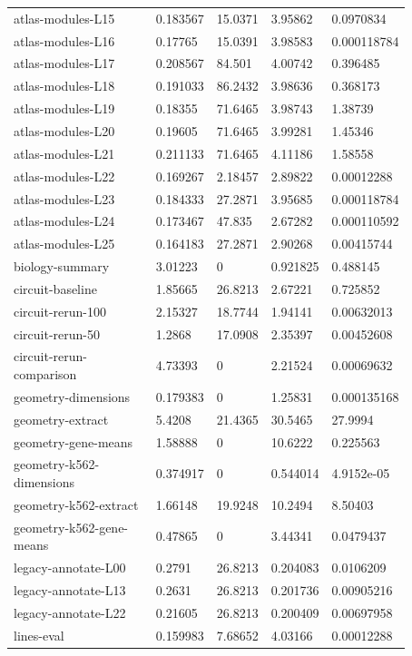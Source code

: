 \begin{longtable}{@{}L{0.39\linewidth}L{0.11\linewidth}L{0.12\linewidth}L{0.12\linewidth}L{0.13\linewidth}@{}}
atlas-modules-L15 & 0.183567 & 15.0371 & 3.95862 & 0.0970834 \\
atlas-modules-L16 & 0.17765 & 15.0391 & 3.98583 & 0.000118784 \\
atlas-modules-L17 & 0.208567 & 84.501 & 4.00742 & 0.396485 \\
atlas-modules-L18 & 0.191033 & 86.2432 & 3.98636 & 0.368173 \\
atlas-modules-L19 & 0.18355 & 71.6465 & 3.98743 & 1.38739 \\
atlas-modules-L20 & 0.19605 & 71.6465 & 3.99281 & 1.45346 \\
atlas-modules-L21 & 0.211133 & 71.6465 & 4.11186 & 1.58558 \\
atlas-modules-L22 & 0.169267 & 2.18457 & 2.89822 & 0.00012288 \\
atlas-modules-L23 & 0.184333 & 27.2871 & 3.95685 & 0.000118784 \\
atlas-modules-L24 & 0.173467 & 47.835 & 2.67282 & 0.000110592 \\
atlas-modules-L25 & 0.164183 & 27.2871 & 2.90268 & 0.00415744 \\
biology-summary & 3.01223 & 0 & 0.921825 & 0.488145 \\
circuit-baseline & 1.85665 & 26.8213 & 2.67221 & 0.725852 \\
circuit-rerun-100 & 2.15327 & 18.7744 & 1.94141 & 0.00632013 \\
circuit-rerun-50 & 1.2868 & 17.0908 & 2.35397 & 0.00452608 \\
circuit-rerun-comparison & 4.73393 & 0 & 2.21524 & 0.00069632 \\
geometry-dimensions & 0.179383 & 0 & 1.25831 & 0.000135168 \\
geometry-extract & 5.4208 & 21.4365 & 30.5465 & 27.9994 \\
geometry-gene-means & 1.58888 & 0 & 10.6222 & 0.225563 \\
geometry-k562-dimensions & 0.374917 & 0 & 0.544014 & \mbox{4.9152e-05} \\
geometry-k562-extract & 1.66148 & 19.9248 & 10.2494 & 8.50403 \\
geometry-k562-gene-means & 0.47865 & 0 & 3.44341 & 0.0479437 \\
legacy-annotate-L00 & 0.2791 & 26.8213 & 0.204083 & 0.0106209 \\
legacy-annotate-L13 & 0.2631 & 26.8213 & 0.201736 & 0.00905216 \\
legacy-annotate-L22 & 0.21605 & 26.8213 & 0.200409 & 0.00697958 \\
lines-eval & 0.159983 & 7.68652 & 4.03166 & 0.00012288 \\

\end{longtable}
